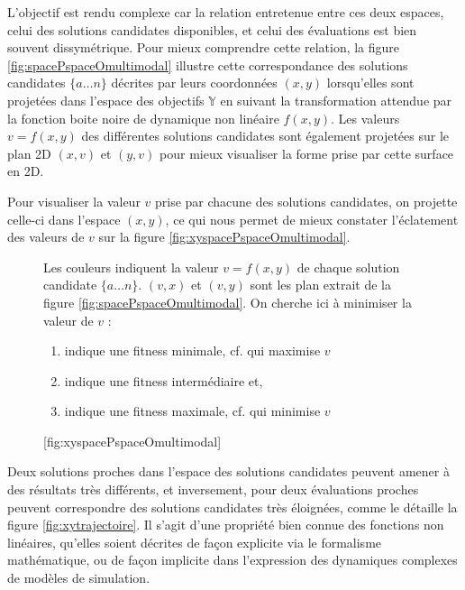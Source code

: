 L'objectif est rendu complexe car la relation entretenue entre ces deux espaces, celui des solutions candidates disponibles, et celui des évaluations est bien souvent dissymétrique. Pour mieux comprendre cette relation, la figure \ref{fig:spacePspaceOmultimodal} illustre cette correspondance des solutions candidates $\{a \dotsc n\}$ décrites par leurs coordonnées $(x,y)$ lorsqu'elles sont projetées dans l'espace des objectifs $\mathbb{Y}$ en suivant la transformation attendue par la fonction boite noire de dynamique non linéaire $f(x,y)$. Les valeurs $v = f(x,y)$ des différentes solutions candidates sont également projetées sur le plan 2D $(x,v)$ et $(y,v)$ pour mieux visualiser la forme prise par cette surface en 2D.

Pour visualiser la valeur $v$ prise par chacune des solutions candidates, on projette celle-ci dans l'espace $(x,y)$, ce qui nous permet de mieux constater l'éclatement des valeurs de $v$ sur la figure \ref{fig:xyspacePspaceOmultimodal}.

\begin{figure}[!htbp]
	\begin{sidecaption}[fortoc]{Les couleurs indiquent la valeur $v = f(x,y)$ de chaque solution candidate $\{a \dotsc n\}$. $(v,x)$ et $(v,y)$ sont les plan extrait de la figure \ref{fig:spacePspaceOmultimodal}. On cherche ici à minimiser la valeur de $v$ :
\parbox{\marginparwidth}{
\begin{enumerate}[label={},labelindent=0pt,leftmargin=*]
        \item {} indique une fitness minimale, cf. qui maximise $v$
        \item {} indique une fitness intermédiaire et,
        \item {} indique une fitness maximale, cf. qui minimise $v$
\end{enumerate}}}[fig:xyspacePspaceOmultimodal]
	 \centering
	\end{sidecaption}
\end{figure}

Deux solutions proches dans l'espace des solutions candidates peuvent amener à des résultats très différents, et inversement, pour deux évaluations proches peuvent correspondre des solutions candidates très éloignées, comme le détaille la figure \ref{fig:xytrajectoire}. Il s'agit d'une propriété bien connue des fonctions non linéaires, qu'elles soient décrites de façon explicite via le formalisme mathématique, ou de façon implicite dans l'expression des dynamiques complexes de modèles de simulation.

